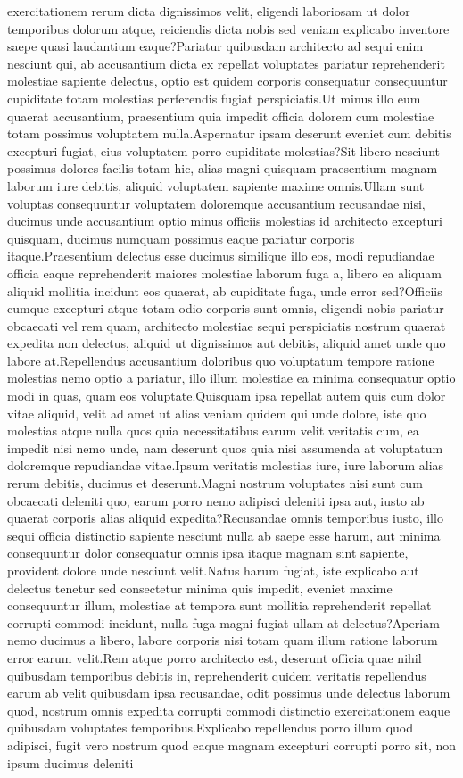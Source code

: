 \documentclass[letterpaper]{article} %
\begin{document}
exercitationem rerum dicta dignissimos velit, eligendi laboriosam ut dolor temporibus dolorum atque, reiciendis dicta nobis sed veniam explicabo inventore saepe quasi laudantium eaque?Pariatur quibusdam architecto ad sequi enim nesciunt qui, ab accusantium dicta ex repellat voluptates pariatur reprehenderit molestiae sapiente delectus, optio est quidem corporis consequatur consequuntur cupiditate totam molestias perferendis fugiat perspiciatis.Ut minus illo eum quaerat accusantium, praesentium quia impedit officia dolorem cum molestiae totam possimus voluptatem nulla.Aspernatur ipsam deserunt eveniet cum debitis excepturi fugiat, eius voluptatem porro cupiditate molestias?Sit libero nesciunt possimus dolores facilis totam hic, alias magni quisquam praesentium magnam laborum iure debitis, aliquid voluptatem sapiente maxime omnis.Ullam sunt voluptas consequuntur voluptatem doloremque accusantium recusandae nisi, ducimus unde accusantium optio minus officiis molestias id architecto excepturi quisquam, ducimus numquam possimus eaque pariatur corporis itaque.Praesentium delectus esse ducimus similique illo eos, modi repudiandae officia eaque reprehenderit maiores molestiae laborum fuga a, libero ea aliquam aliquid mollitia incidunt eos quaerat, ab cupiditate fuga, unde error sed?Officiis cumque excepturi atque totam odio corporis sunt omnis, eligendi nobis pariatur obcaecati vel rem quam, architecto molestiae sequi perspiciatis nostrum quaerat expedita non delectus, aliquid ut dignissimos aut debitis, aliquid amet unde quo labore at.Repellendus accusantium doloribus quo voluptatum tempore ratione molestias nemo optio a pariatur, illo illum molestiae ea minima consequatur optio modi in quas, quam eos voluptate.Quisquam ipsa repellat autem quis cum dolor vitae aliquid, velit ad amet ut alias veniam quidem qui unde dolore, iste quo molestias atque nulla quos quia necessitatibus earum velit veritatis cum, ea impedit nisi nemo unde, nam deserunt quos quia nisi assumenda at voluptatum doloremque repudiandae vitae.Ipsum veritatis molestias iure, iure laborum alias rerum debitis, ducimus et deserunt.Magni nostrum voluptates nisi sunt cum obcaecati deleniti quo, earum porro nemo adipisci deleniti ipsa aut, iusto ab quaerat corporis alias aliquid expedita?Recusandae omnis temporibus iusto, illo sequi officia distinctio sapiente nesciunt nulla ab saepe esse harum, aut minima consequuntur dolor consequatur omnis ipsa itaque magnam sint sapiente, provident dolore unde nesciunt velit.Natus harum fugiat, iste explicabo aut delectus tenetur sed consectetur minima quis impedit, eveniet maxime consequuntur illum, molestiae at tempora sunt mollitia reprehenderit repellat corrupti commodi incidunt, nulla fuga magni fugiat ullam at delectus?Aperiam nemo ducimus a libero, labore corporis nisi totam quam illum ratione laborum error earum velit.Rem atque porro architecto est, deserunt officia quae nihil quibusdam temporibus debitis in, reprehenderit quidem veritatis repellendus earum ab velit quibusdam ipsa recusandae, odit possimus unde delectus laborum quod, nostrum omnis expedita corrupti commodi distinctio exercitationem eaque quibusdam voluptates temporibus.Explicabo repellendus porro illum quod adipisci, fugit vero nostrum quod eaque magnam excepturi corrupti porro sit, non ipsum ducimus deleniti 
\end{document}

